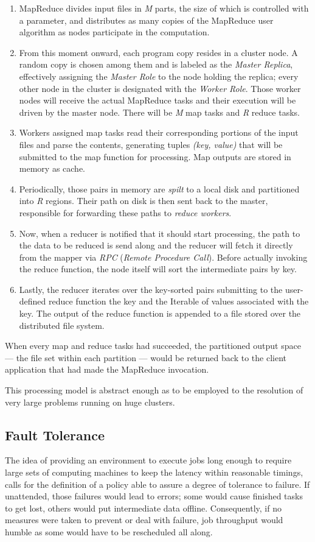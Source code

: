 \begin{enumerate}
 \item MapReduce divides input files in \emph{M} parts, the size of which is controlled with a parameter, and distributes as many copies of the MapReduce user algorithm as nodes participate in the computation.
 \item From this moment onward, each program copy resides in a cluster node. A random copy is chosen among them and is labeled as the \emph{Master Replica}, effectively assigning the \emph{Master Role} to the node holding the replica; every other node in the cluster is designated with the \emph{Worker Role}. Those worker nodes will receive the actual MapReduce tasks and their execution will be driven by the master node. There will be \emph{M} map tasks and \emph{R} reduce tasks.
 \item Workers assigned map tasks read their corresponding portions of the input files and parse the contents, generating tuples \emph{(key, value)} that will be submitted to the map function for processing. Map outputs are stored in memory as cache.
 \item Periodically, those pairs in memory are \emph{spilt} to a local disk and partitioned into \emph{R} regions. Their path on disk is then sent back to the master, responsible for forwarding these paths to \emph{reduce workers}.
 \item Now, when a reducer is notified that it should start processing, the path to the data to be reduced is send along and the reducer will fetch it directly from the mapper via \emph{RPC} (\emph{Remote Procedure Call}). Before actually invoking the reduce function, the node itself will sort the intermediate pairs by key.
 \item Lastly, the reducer iterates over the key-sorted pairs submitting to the user-defined reduce function the key and the Iterable of values associated with the key. The output of the reduce function is appended to a file stored over the distributed file system.
\end{enumerate}

When every map and reduce tasks had succeeded, the partitioned output space --- the file set within each partition --- would be returned back to the client application that had made the MapReduce invocation.

This processing model is abstract enough as to be employed to the resolution of very large problems running on huge clusters.

\subsection{Fault Tolerance}\label{subsec:toleranciafallos}
\noindent The idea of providing an environment to execute jobs long enough to require large sets of computing machines to keep the latency within reasonable timings, calls for the definition of a policy able to assure a degree of tolerance to failure. If unattended, those failures would lead to errors; some would cause finished tasks to get lost, others would put intermediate data offline. Consequently, if no measures were taken to prevent or deal with failure, job throughput would humble as some would have to be rescheduled all along.

